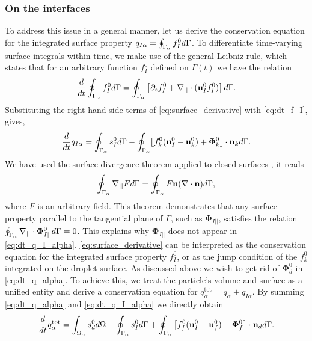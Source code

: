 \subsubsection{On the interfaces}
To address this issue in a general manner, let us derive the conservation equation for the integrated surface property $q_{I\alpha} = \oint_{\Gamma_\alpha} f_I^0 d\Gamma$.
To differentiate time-varying surface integrals within time, we make use of the general Leibniz rule, which states that for an arbitrary function $f_I^0$ defined on $\Gamma(t)$ we have the relation \citep{nadim1996concise}
\begin{equation}
    \frac{d}{dt}  \oint_{\Gamma_\alpha} f_I^0  d\Gamma
    = \oint_{\Gamma_\alpha}  \left[
        \partial_t f_I^0
        +   \mathbf{\nabla}_{||} \cdot (\textbf{u}_I^0f_I^0)
    \right] d\Gamma.
    \label{eq:surface_derivative}
\end{equation}
Substituting the right-hand side terms of \ref{eq:surface_derivative} with \ref{eq:dt_f_I}, gives,
\begin{equation}
    \frac{d}{dt}  q_{I\alpha}
    = \oint_{\Gamma_\alpha}  
        s_I^0
     d\Gamma
    - \oint_{\Gamma_\alpha} 
 \llbracket 
        f_k^0 (\textbf{u}_I^0 - \textbf{u}_k^0)
        + \mathbf{\Phi}_k^0
     \rrbracket \cdot \textbf{n}_k
     d\Gamma.
    \label{eq:dt_q_I_alpha}
\end{equation}
We have used the surface divergence theorem applied to closed surfaces \citep{nadim1996concise}, it reads
\begin{equation}
    \oint_{\Gamma_\alpha} \mathbf{\nabla}_{||} F d\Gamma
    = 
    \oint_{\Gamma_\alpha}  F \textbf{n} (\mathbf{\nabla}\cdot \textbf{n}) d\Gamma,
    \label{eq:gauss_surface}
\end{equation} 
where $F$ is an arbitrary field.
This theorem demonstrates that any surface property parallel to the tangential plane of $\Gamma$, such as $\bm\Phi_{I||}$, satisfies the relation $\oint_{\Gamma_\alpha} \mathbf{\nabla}_{||}\cdot \bm\Phi_{I||}^0 d\Gamma
= 0$.
This explains why $\bm\Phi_{I||}$ does not appear in \ref{eq:dt_q_I_alpha}. 
\ref{eq:surface_derivative} can be interpreted as the conservation equation for the integrated surface property $f_I^0$, or as the jump condition of the $f^0_k$ integrated on the droplet surface. 
As discussed above we wish to get rid of $\mathbf{\Phi}_d^0$ in \ref{eq:dt_q_alpha}. 
To achieve this, we treat the particle's volume and surface as a unified entity and derive a conservation equation for $q_\alpha^\text{tot} = q_\alpha + q_{I\alpha}$. 
By summing \ref{eq:dt_q_alpha} and \ref{eq:dt_q_I_alpha} we directly obtain 
\begin{equation}
    \frac{d}{dt}  q_\alpha^\text{tot}
    = 
    \int_{\Omega_\alpha}  s_d^0  d\Omega
    + \oint_{\Gamma_\alpha}  s_I^0  d\Gamma
    + \oint_{\Gamma_\alpha}  \left[
        f_f^0 (\textbf{u}_I^0-\textbf{u}_f^0) 
        + \mathbf{\Phi}_f^0 
        \right] \cdot \textbf{n}_d  d\Gamma. 
    \label{eq:dt_q_alpha_tot}
\end{equation}
